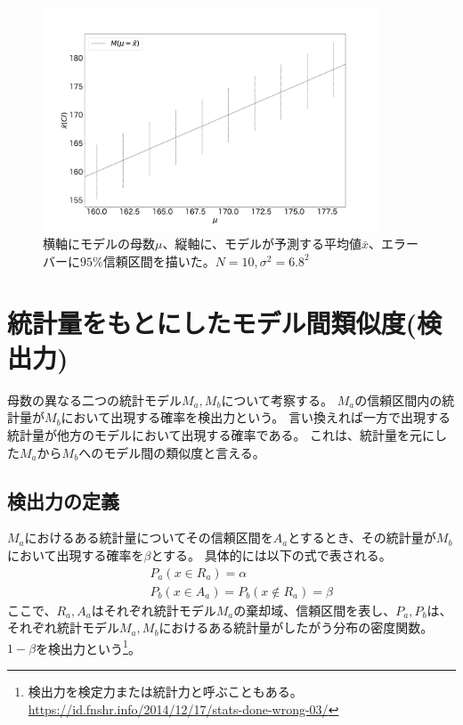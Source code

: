 \begin{figure}
    \begin{center}
        \includegraphics[width=10cm]{./image/04_/confidence_interval_model.pdf}
        \caption{横軸にモデルの母数$\mu$、縦軸に、モデルが予測する平均値$\bar{x}$、エラーバーに$95\%$信頼区間を描いた。$N=10,\sigma^2=6.8^2$}
        \label{fig:confidence_interval_model}

    \end{center}
\end{figure}



\section{統計量をもとにしたモデル間類似度(検出力)}
母数の異なる二つの統計モデル$M_a,M_b$について考察する。
$M_a$の信頼区間内の統計量が$M_b$において出現する確率を検出力という。
言い換えれば一方で出現する統計量が他方のモデルにおいて出現する確率である。
これは、統計量を元にした$M_a$から$M_b$へのモデル間の類似度と言える。

\subsection{検出力の定義}
$M_a$におけるある統計量についてその信頼区間を$A_a$とするとき、その統計量が$M_b$において出現する確率を$\beta$とする。
具体的には以下の式で表される。
\begin{eqnarray*}
    & &P_a(x \in R_a) = \alpha\\
    & & P_b(x \in A_a) = P_b(x\notin R_a )=\beta
\end{eqnarray*}
ここで、$R_a,A_a$はそれぞれ統計モデル$M_a$の棄却域、信頼区間を表し、$P_a,P_b$は、それぞれ統計モデル$M_a,M_b$におけるある統計量がしたがう分布の密度関数。
$1-\beta$を検出力という\footnote{検出力を検定力または統計力と呼ぶこともある。\\ \url{https://id.fnshr.info/2014/12/17/stats-done-wrong-03/}}。


